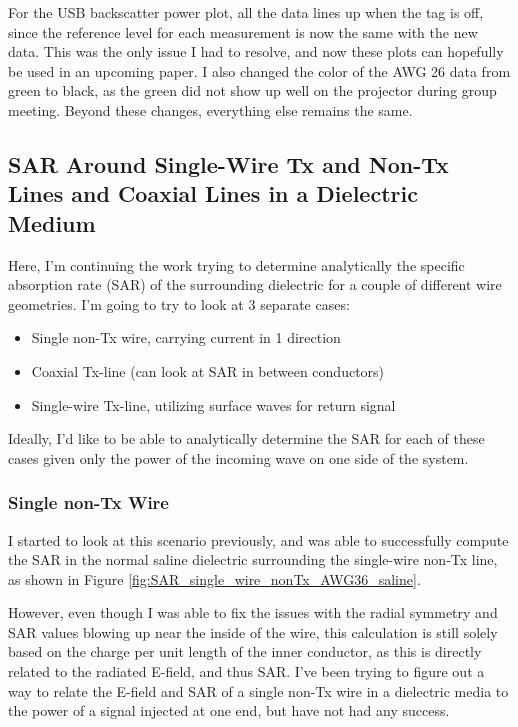 \documentclass[12pt,onecolumn,titlepage]{article}
\begin{document}
For the USB backscatter power plot, all the data lines up when the tag is off, since the reference level for each measurement is now the same with the new data. This was the only issue I had to resolve, and now these plots can hopefully be used in an upcoming paper. I also changed the color of the AWG 26 data from green to black, as the green did not show up well on the projector during group meeting. Beyond these changes, everything else remains the same. 



\subsection{SAR Around Single-Wire Tx and Non-Tx Lines and Coaxial Lines in a Dielectric Medium}
\indent \indent Here, I'm continuing the work trying to determine analytically the specific absorption rate (SAR) of the surrounding dielectric for a couple of different wire geometries. I'm going to try to look at 3 separate cases: 

\begin{itemize}
\item Single non-Tx wire, carrying current in 1 direction
\item Coaxial Tx-line (can look at SAR in between conductors)
\item Single-wire Tx-line, utilizing surface waves for return signal
\end{itemize}


Ideally, I'd like to be able to analytically determine the SAR for each of these cases given only the power of the incoming wave on one side of the system.


\subsubsection{Single non-Tx Wire}
\indent \indent I started to look at this scenario previously, and was able to successfully compute the SAR in the normal saline dielectric surrounding the single-wire non-Tx line, as shown in Figure \ref{fig:SAR_single_wire_nonTx_AWG36_saline}.

However, even though I was able to fix the issues with the radial symmetry and SAR values blowing up near the inside of the wire, this calculation is still solely based on the charge per unit length of the inner conductor, as this is directly related to the radiated E-field, and thus SAR. I've been trying to figure out a way to relate the E-field and SAR of a single non-Tx wire in a dielectric media to the power of a signal injected at one end, but have not had any success.
\end{document}

